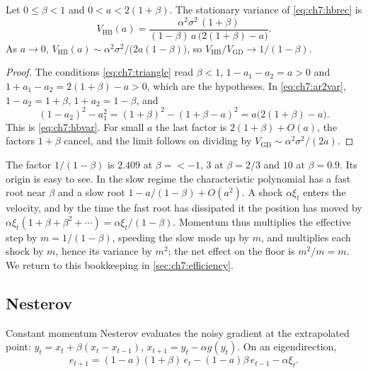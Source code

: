 \begin{proposition}\label{prop:ch7:hb}
Let $0\le\beta<1$ and $0<a<2(1+\beta)$. The stationary variance of
\eqref{eq:ch7:hbrec} is
\begin{equation}\label{eq:ch7:hbvar}
  V_{\mathrm{HB}}(a)=\frac{\alpha^2\sigma^2\,(1+\beta)}{(1-\beta)\,a\,\bigl(2(1+\beta)-a\bigr)} .
\end{equation}
As $a\to0$, $V_{\mathrm{HB}}(a)\sim\alpha^2\sigma^2/\bigl(2a(1-\beta)\bigr)$, so
$V_{\mathrm{HB}}/V_{\mathrm{GD}}\to1/(1-\beta)$.
\end{proposition}

\begin{proof}
The conditions \eqref{eq:ch7:triangle} read $\beta<1$, $1-a_1-a_2=a>0$ and
$1+a_1-a_2=2(1+\beta)-a>0$, which are the hypotheses. In
\eqref{eq:ch7:ar2var}, $1-a_2=1+\beta$, $1+a_2=1-\beta$, and
\[
  (1-a_2)^2-a_1^2=(1+\beta)^2-(1+\beta-a)^2=a\bigl(2(1+\beta)-a\bigr).
\]
This is \eqref{eq:ch7:hbvar}. For small $a$ the last factor is
$2(1+\beta)+O(a)$, the factors $1+\beta$ cancel, and the limit follows on
dividing by $V_{\mathrm{GD}}\sim\alpha^2\sigma^2/(2a)$.
\end{proof}

The factor $1/(1-\beta)$ is $2.409$ at $\beta=\lt-1$, $3$ at $\beta=2/3$ and $10$
at $\beta=0.9$. Its origin is easy to see. In the slow regime the characteristic
polynomial has a fast root near $\beta$ and a slow root $1-a/(1-\beta)+O(a^2)$.
A shock $\alpha\xi_t$ enters the velocity, and by the time the fast root has
dissipated it the position has moved by
$\alpha\xi_t(1+\beta+\beta^2+\cdots)=\alpha\xi_t/(1-\beta)$. Momentum thus
multiplies the effective step by $m=1/(1-\beta)$, speeding the slow mode up by
$m$, and multiplies each shock by $m$, hence its variance by $m^2$; the net
effect on the floor is $m^2/m=m$. We return to this bookkeeping in
\cref{sec:ch7:efficiency}.

\subsection{Nesterov}

Constant momentum Nesterov evaluates the noisy gradient at the extrapolated
point: $y_t=x_t+\beta(x_t-x_{t-1})$, $x_{t+1}=y_t-\alpha g(y_t)$. On an
eigendirection,
\begin{equation}\label{eq:ch7:nagrec}
  e_{t+1}=(1-a)(1+\beta)\,e_t-(1-a)\beta\,e_{t-1}-\alpha\xi_t .
\end{equation}

